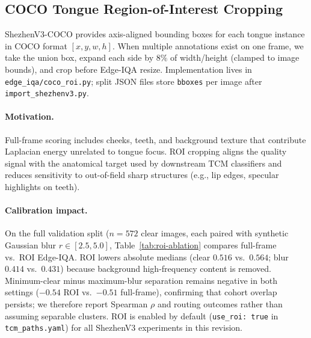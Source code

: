 \subsection{COCO Tongue Region-of-Interest Cropping}
\label{sec:roi}

ShezhenV3-COCO provides axis-aligned bounding boxes for each tongue instance in COCO format $[x,y,w,h]$.
When multiple annotations exist on one frame, we take the union box, expand each side by $8\%$ of width/height (clamped to image bounds), and crop before Edge-IQA resize.
Implementation lives in \texttt{edge\_iqa/coco\_roi.py}; split JSON files store \texttt{bboxes} per image after \texttt{import\_shezhenv3.py}.

\paragraph{Motivation.}
Full-frame scoring includes cheeks, teeth, and background texture that contribute Laplacian energy unrelated to tongue focus.
ROI cropping aligns the quality signal with the anatomical target used by downstream TCM classifiers and reduces sensitivity to out-of-field sharp structures (e.g., lip edges, specular highlights on teeth).

\paragraph{Calibration impact.}
On the full validation split ($n{=}572$ clear images, each paired with synthetic Gaussian blur $r{\in}[2.5,5.0]$, Table~\ref{tab:roi-ablation} compares full-frame vs.\ ROI Edge-IQA.
ROI lowers absolute medians (clear $0.516$ vs.\ $0.564$; blur $0.414$ vs.\ $0.431$) because background high-frequency content is removed.
Minimum-clear minus maximum-blur separation remains negative in both settings ($-0.54$ ROI vs.\ $-0.51$ full-frame), confirming that cohort overlap persists; we therefore report Spearman $\rho$ and routing outcomes rather than assuming separable clusters.
ROI is enabled by default (\texttt{use\_roi: true} in \texttt{tcm\_paths.yaml}) for all ShezhenV3 experiments in this revision.

\begin{table}[t]
\centering
\caption{Edge-IQA calibration: full frame vs.\ COCO tongue ROI (ShezhenV3 val, $n{=}572$ per cohort).}
\label{tab:roi-ablation}
\small
{}
\end{table}

